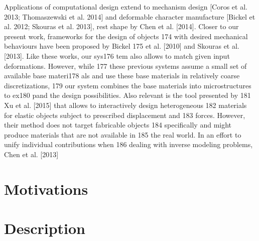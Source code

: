 Applications of computational design extend
to mechanism design [Coros et al. 2013; Thomaszewski et al.
2014] and deformable character manufacture [Bickel et al. 2012;
Skouras et al. 2013],
  rest shape by Chen et al. [2014].
Closer to our present work, frameworks for the design of objects
174 with desired mechanical behaviours have been proposed by Bickel
175 et al. [2010] and Skouras et al. [2013]. Like these works, our sys176
tem also allows to match given input deformations. However, while
177 these previous systems assume a small set of available base materi178
als and use these base materials in relatively coarse discretizations,
179 our system combines the base materials into microstructures to ex180
pand the design possibilities. Also relevant is the tool presented by
181 Xu et al. [2015] that allows to interactively design heterogeneous
182 materials for elastic objects subject to prescribed displacement and
183 forces. However, their method does not target fabricable objects
184 specifically and might produce materials that are not available in
185 the real world. In an effort to unify individual contributions when
186 dealing with inverse modeling problems, Chen et al. [2013]

\section{Motivations}


\section{Description}\label{ch1:desc}


\subsection{}


\subsection{}

\section{}


\subsection{}

\subsection{}

\section{}

\subsection{}

\subsection{}
